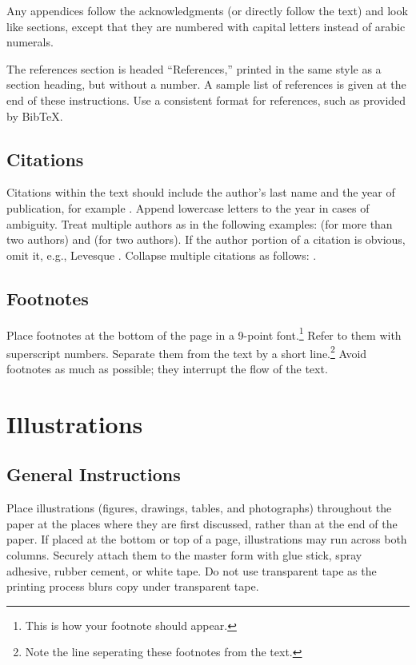 \documentclass{article}
\begin{document}
Any appendices follow the acknowledgments (or directly follow the text) and
look like sections, except that they are numbered with capital letters
instead of arabic numerals. 

The references section is headed ``References,'' printed in the same
style as a section heading, but without a number.
A sample list of references is given at the end of these
instructions.
Use a consistent format for references, such as provided by
Bib\TeX{}.

\subsection{Citations}

Citations within the text should include the author's last name and
the year of publication, for example \cite{cheeseman:probability}.
Append lowercase letters to the year in cases of ambiguity.
Treat multiple authors as in the following examples:
\cite{abelson-et-al:scheme} (for more than two authors) and
\cite{brachman-schmolze:kl-one} (for two authors).
If the author portion of a citation is obvious, omit it,
e.g., Levesque .
Collapse multiple citations as follows:
\cite{levesque:functional-foundations,haugeland:mind-design}.%
\nocite{abelson-et-al:scheme}%
\nocite{brachman-schmolze:kl-one}%
\nocite{cheeseman:probability}%
\nocite{haugeland:mind-design}%
\nocite{lenat:heuristics}%
\nocite{levesque:functional-foundations}%
\nocite{levesque:belief}

\subsection{Footnotes} 
Place footnotes at the bottom of the page in a 9-point font.\footnote{This is how your footnote should appear.} 
Refer to them with superscript numbers. 
Separate them from the text by a short line.\footnote{Note the line seperating these footnotes from the text.}
Avoid footnotes as much as possible; they interrupt the flow of the text.

\section{Illustrations}

\subsection{General Instructions}
Place illustrations (figures, drawings, tables, and photographs) throughout the paper at the places where they are first discussed, rather than at the end of the paper. If placed at the bottom or top of a page, illustrations may run across
both columns. Securely attach them to the master form with glue stick, spray 
adhesive, rubber cement, or white tape. Do not use transparent tape as the 
printing process blurs copy under transparent tape.
\end{document}
